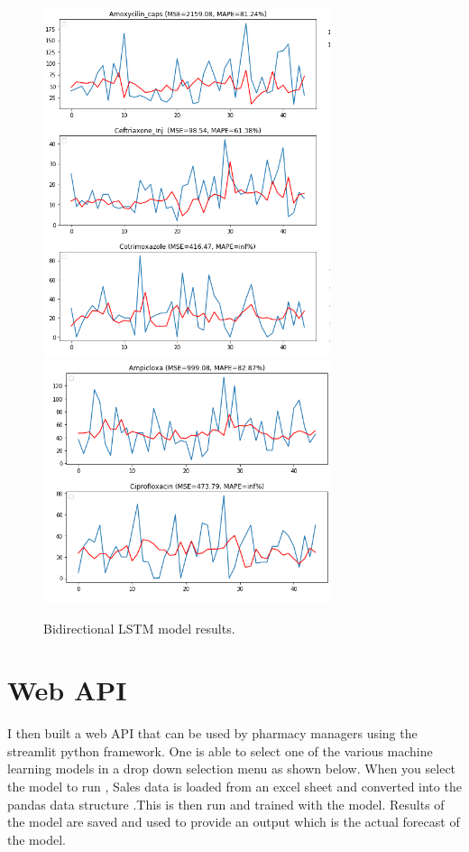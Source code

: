 \documentclass[12pt]{report}
\begin{document}
\begin{figure}[H]%
\begin {center}
\includegraphics[width=0.75\textwidth]{images/bi (5).png}
\includegraphics[width=0.75\textwidth]{images/bi (6).png}
\caption{Bidirectional LSTM model results.}
\label{fig:ecg}
\end {center}
\end{figure}

\section{Web API}
I then built a web API that can be used by pharmacy managers using the streamlit python framework. One is able to select one of the various machine learning models in a drop down selection menu as shown below.
When you select the model to run , Sales data is loaded from an excel sheet and converted into the pandas data structure .This is then run and trained with the model. Results of the model are saved and used to provide an output which is the actual forecast of the model. 
\end{document}
